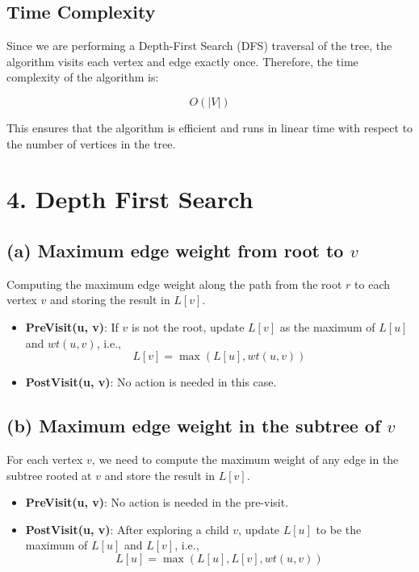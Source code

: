 \documentclass[11pt]{article}
\begin{document}
\subsection*{Time Complexity}
Since we are performing a Depth-First Search (DFS) traversal of the tree, the algorithm visits each vertex and edge exactly once. Therefore, the time complexity of the algorithm is:

\[
O(|V|)
\]

This ensures that the algorithm is efficient and runs in linear time with respect to the number of vertices in the tree.

\newpage
\section*{4. Depth First Search}

\subsection*{(a) Maximum edge weight from root to \( v \)}

Computing the maximum edge weight along the path from the root \( r \) to each vertex \( v \) and storing the result in \( L[v] \).

\begin{itemize}
    \item \textbf{PreVisit(u, v)}: If \( v \) is not the root, update \( L[v] \) as the maximum of \( L[u] \) and \( wt(u, v) \), i.e.,
    \[
    L[v] = \max(L[u], wt(u, v))
    \]
    \item \textbf{PostVisit(u, v)}: No action is needed in this case.
\end{itemize}

\subsection*{(b) Maximum edge weight in the subtree of \( v \)}

For each vertex \( v \), we need to compute the maximum weight of any edge in the subtree rooted at \( v \) and store the result in \( L[v] \).

\begin{itemize}
    \item \textbf{PreVisit(u, v)}: No action is needed in the pre-visit.
    \item \textbf{PostVisit(u, v)}: After exploring a child \( v \), update \( L[u] \) to be the maximum of \( L[u] \) and \( L[v] \), i.e.,
    \[
    L[u] = \max(L[u], L[v], wt(u, v))
    \]
\end{itemize}
\end{document}

